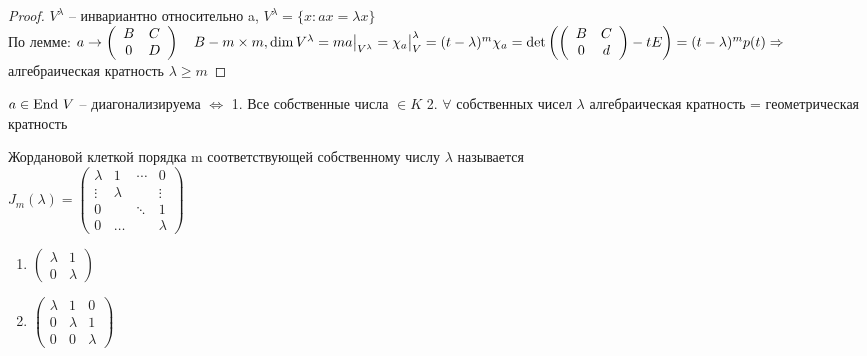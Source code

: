 \begin{proof}
	$V^{\lambda}$ -- инвариантно относительно a, $V^{\lambda} = \{x: ax = \lambda x\}$\\
	По лемме: $a \to \left(\begin{array}{cc}
		B & C\\
		0 & D
	\end{array}\right) \ \ \ B - m \times m, \dim V^{\lambda} = m\\
	a \big|_{V^{\lambda}} = \chi_a \big|_V^{\lambda} = (t - \lambda)^m\\
	\chi_a = \det \left( \left(\begin{array}{cc}
		B & C\\
		0 & d
	\end{array}\right) - tE \right) = (t - \lambda)^m p(t) \Rightarrow$ алгебраическая кратность $\lambda \geqslant m$ 
\end{proof}

\begin{Thm} 
	$a \in \operatorname{End} \, V$ -- диагонализируема $\Leftrightarrow$ 1. Все собственные числа $\in K$ 2. $\forall$ собственных чисел $\lambda$ алгебраическая кратность = геометрическая кратность 
\end{Thm} 

\begin{Def} 
	Жордановой клеткой порядка m соответствующей собственному числу $\lambda$ называется\\
	$J_m(\lambda) = \left( \begin{array}{cccc}
		\lambda & 1 & \cdots & 0\\
		\vdots & \lambda &  & \vdots\\
		0 & & \ddots &  1\\
		0 & \dots & & \lambda
	\end{array} \right)$
\end{Def} 

\begin{Example}
	\begin{enumerate}
		\item $\left(\begin{array}{cc}
			\lambda & 1\\
			0 & \lambda
		\end{array}\right)$
		\item $\left(\begin{array}{ccc}
			\lambda & 1 & 0\\
			0 & \lambda & 1\\
			0 & 0 & \lambda
		\end{array}\right)$
	\end{enumerate}
\end{Example}

